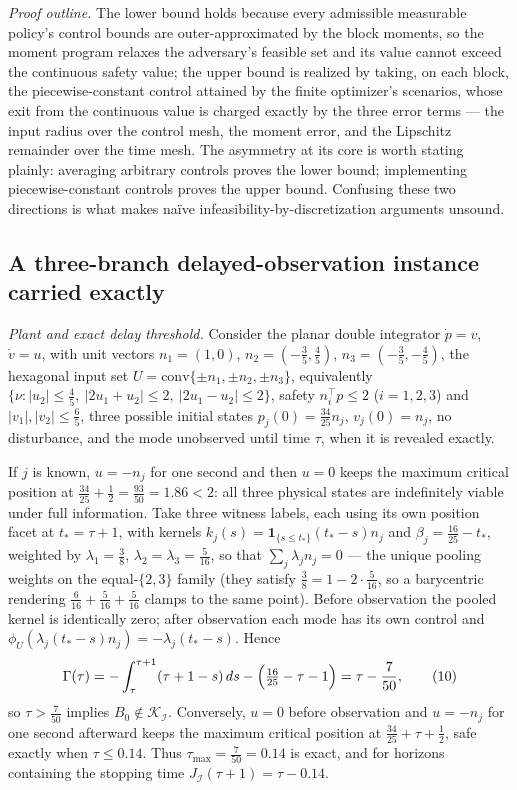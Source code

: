 \documentclass[10pt,twocolumn]{article}
\theoremstyle{plain}
\theoremstyle{definition}
\theoremstyle{remark}
\begin{document}
\emph{Proof outline.} The lower bound holds because every admissible
measurable policy's control bounds are outer-approximated by the block
moments, so the moment program relaxes the adversary's feasible set and
its value cannot exceed the continuous safety value; the upper bound is
realized by taking, on each block, the piecewise-constant control
attained by the finite optimizer's scenarios, whose exit from the
continuous value is charged exactly by the three error terms --- the
input radius over the control mesh, the moment error, and the Lipschitz
remainder over the time mesh. The asymmetry at its core is
worth stating plainly: averaging arbitrary controls proves the lower bound;
implementing piecewise-constant controls proves the upper bound. Confusing
these two directions is what makes na\"ive infeasibility-by-discretization
arguments unsound.

\subsection{A three-branch delayed-observation instance carried exactly}\label{instance}

\emph{Plant and exact delay threshold.} Consider the planar double integrator
\(\dot p = v\), \(\dot v = u\), with unit vectors \(n_1 = (1,0)\),
\(n_2 = (-\tfrac35, \tfrac45)\), \(n_3 = (-\tfrac35, -\tfrac45)\), the
hexagonal input set
\(U = \mathrm{conv}\{\pm n_1, \pm n_2, \pm n_3\}\), equivalently
\(\{\nu : |u_2| \le \tfrac45,\ |2u_1 + u_2| \le 2,\ |2u_1 - u_2| \le 2\}\),
safety \(n_i^\top p \le 2\) (\(i = 1,2,3\)) and
\(|v_1|, |v_2| \le \tfrac65\), three possible initial states
\(p_j(0) = \tfrac{34}{25} n_j\), \(v_j(0) = n_j\), no disturbance, and the
mode unobserved until time \(\tau\), when it is revealed exactly.

If \(j\) is known, \(u = -n_j\) for one second and then \(u = 0\) keeps the
maximum critical position at \(\tfrac{34}{25} + \tfrac12 = \tfrac{93}{50} =
1.86 < 2\): all three physical states are indefinitely viable under full
information. Take three witness labels, each using its own position facet at
\(t_* = \tau + 1\), with kernels
\(k_j(s) = \mathbf{1}_{\{s \le t_*\}} (t_* - s) n_j\) and
\(\beta_j = \tfrac{16}{25} - t_*\), weighted by \(\lambda_1 = \tfrac38\),
\(\lambda_2 = \lambda_3 = \tfrac{5}{16}\), so that
\(\sum_j \lambda_j n_j = 0\) --- the unique pooling weights on the
equal-\(\{2,3\}\) family (they satisfy
\(\tfrac38 = 1 - 2 \cdot \tfrac{5}{16}\), so a barycentric rendering
\(\tfrac{6}{16} + \tfrac{5}{16} + \tfrac{5}{16}\) clamps to the same
point). Before observation the pooled kernel is
identically zero; after observation each mode has its own control and
\(\phi_U(\lambda_j (t_* - s) n_j) = -\lambda_j (t_* - s)\). Hence
\[
\Gamma(\tau) = -\int_\tau^{\tau+1} (\tau + 1 - s)\, ds
- \Bigl(\tfrac{16}{25} - \tau - 1\Bigr) = \tau - \frac{7}{50},
\tag{10}
\]
so \(\tau > \tfrac{7}{50}\) implies
\(B_0 \notin \mathcal{K}_{\mathcal{I}}\). Conversely, \(u = 0\) before
observation and \(u = -n_j\) for one second afterward keeps the maximum
critical position at \(\tfrac{34}{25} + \tau + \tfrac12\), safe exactly when
\(\tau \le 0.14\). Thus \(\tau_{\max} = \tfrac{7}{50} = 0.14\) is exact, and
for horizons containing the stopping time
\(J_{\mathcal{I}}(\tau + 1) = \tau - 0.14\).
\end{document}
